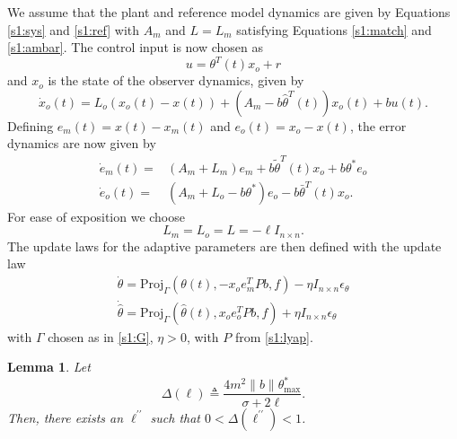 \documentclass[10pt,journal]{IEEEtran}
\theoremstyle{plain}%
\newtheorem{lem}[thm]{Lemma}
\theoremstyle{definition}
\newcommand{\be}[0]{\begin{equation}}
\newcommand{\ee}[0]{\end{equation}}
\newcommand{\norms}[1]{\lVert#1\rVert}
\newcommand{\normB}[0]{\norms}
\let\norm=\normB
\begin{document}
We assume that the plant and reference model dynamics are given by Equations \eqref{s1:sys} and \eqref{s1:ref} with $A_m$ and $L=L_m$ satisfying Equations \eqref{s1:match} and \eqref{s1:ambar}. The control input is now chosen as
\be\label{s6:u}
u= \theta^T(t) x_o + r
\ee
and $x_o$ is the state of the observer dynamics, given by
\be\label{s6:o}
\dot x_o(t) = L_o (x_o(t) - x(t)) + (A_m- b\hat \theta^T(t) )x_o(t) + b u(t).
\ee
Defining $e_m(t) = x(t)-x_m(t)$ and $e_o(t)=x_o-x(t)$, the error dynamics are now given by
\be
\begin{split}\label{s6:e}
\dot e_m(t) =& (A_m+L_m) e_m +b \tilde \theta ^T (t)x_o +b\theta^*e_o \\
\dot e_o(t) =& (A_m+L_o-b\theta^*) e_o -b \bar \theta ^T (t)x_o. 
\end{split}
\ee
For ease of exposition we choose
\be\label{s10:l}
L_m=L_o= L=-\ell  I_{n\times n}.
\ee
The update laws for the adaptive parameters are then defined with the update law
\be\label{s6:law}\begin{split}
\dot \theta = \text{Proj}_\Gamma  (\theta(t),-x_o e_{m}^T P b,f)  - \eta I_{n\times n} \epsilon_\theta\\
\dot {\hat \theta} = \text{Proj}_\Gamma (\hat\theta(t), x_o e_o^T P b,f)+\eta I_{n\times n} \epsilon_\theta
\end{split}\ee
with $\Gamma$ chosen as in \eqref{s1:G}, $\eta>0$, with $P$ from \eqref{s1:lyap}.


\begin{lem} Let 
\be\label{s6:d}
\Delta(\ell) \triangleq    \frac{4 m^2 \norm b \theta_\text{max}^*}{\sigma+2\ell } .\ee
Then, there exists an $\ell^{\prime\prime}$ such that  $0<\Delta(\ell^{\prime\prime})<1$.
\end{lem}
\end{document}
